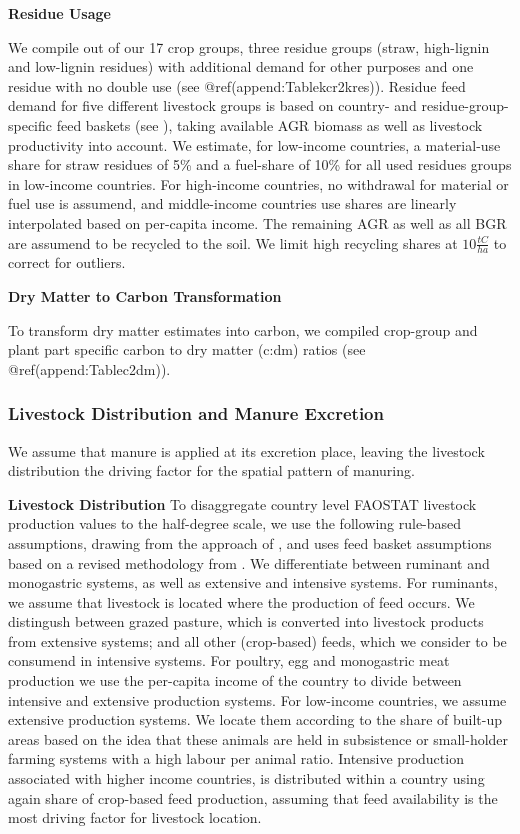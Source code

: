 \documentclass[gc, manuscript]{copernicus}
\begin{document}
\textbf{Residue Usage}

We compile out of our 17 crop groups, three residue groups (straw,
high-lignin and low-lignin residues) with additional demand for other
purposes and one residue with no double use (see
@ref(append:Tablekcr2kres)). Residue feed demand for five different
livestock groups is based on country- and residue-group-specific feed
baskets (see \citep{weindl}), taking available AGR biomass as well as
livestock productivity into account. We estimate, for low-income
countries, a material-use share for straw residues of 5\% and a
fuel-share of 10\% for all used residues groups in low-income countries.
For high-income countries, no withdrawal for material or fuel use is
assumend, and middle-income countries use shares are linearly
interpolated based on per-capita income. The remaining AGR as well as
all BGR are assumend to be recycled to the soil. We limit high recycling
shares at \(10\tfrac{\unit{tC}}{\unit{ha}}\) to correct for outliers.

\textbf{Dry Matter to Carbon Transformation}

To transform dry matter estimates into carbon, we compiled crop-group
and plant part specific carbon to dry matter (c:dm) ratios (see
@ref(append:Tablec2dm)).

\hypertarget{sec:livstmanure}{%
\subsubsection{Livestock Distribution and Manure
Excretion}\label{sec:livstmanure}}

We assume that manure is applied at its excretion place, leaving the
livestock distribution the driving factor for the spatial pattern of
manuring.

\textbf{Livestock Distribution} To disaggregate country level FAOSTAT
livestock production values to the half-degree scale, we use the
following rule-based assumptions, drawing from the approach of
\citep{robinson_mapping_2014}, and uses feed basket assumptions based on
a revised methodology from \citep{weindl}. We differentiate between
ruminant and monogastric systems, as well as extensive and intensive
systems. For ruminants, we assume that livestock is located where the
production of feed occurs. We distingush between grazed pasture, which
is converted into livestock products from extensive systems; and all
other (crop-based) feeds, which we consider to be consumend in intensive
systems. For poultry, egg and monogastric meat production we use the
per-capita income of the country to divide between intensive and
extensive production systems. For low-income countries, we assume
extensive production systems. We locate them according to the share of
built-up areas based on the idea that these animals are held in
subsistence or small-holder farming systems with a high labour per
animal ratio. Intensive production associated with higher income
countries, is distributed within a country using again share of
crop-based feed production, assuming that feed availability is the most
driving factor for livestock location.
\end{document}

